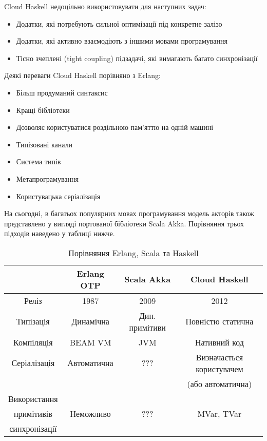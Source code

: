 \documentclass[12pt]{article}
\begin{document}
Cloud Haskell недоцільно використовувати для наступних задач:\\

\begin{itemize}
\item Додатки, які потребують сильної оптимізації під конкретне залізо
\item Додатки, які активно взаємодіють з іншими мовами програмування
\item Тісно зчеплені (tight coupling) підзадачі, які вимагають багато синхронізації
\end{itemize}

Деякі переваги Cloud Haskell порівняно з Erlang:\\
\begin{itemize}
\item Більш продуманий синтаксис
\item Кращі бібліотеки
\item Дозволяє користуватися роздільною пам'яттю на одній машині
\item Типізовані канали
\item Система типів
\item Метапрограмування
\item Користувацька серіалізація
\end{itemize}

На сьогодні, в багатьох популярних мовах програмування модель акторів також представлено у вигляді портованої бібліотеки Scala Akka. Порівняння трьох підходів наведено у таблиці нижче.

\begin {table}
\begin{center}
\begin{tabular}{ c|c|c|c } 
              & Erlang OTP  & Scala Akka           & Cloud Haskell            \\
\hline
Реліз         & 1987        & 2009                 & 2012                     \\ 

Типізація     & Динамічна   & Дин. примітиви       & Повністю статична        \\ 

Компіляція    & BEAM VM     & JVM                  & Нативний код             \\ 

Серіалізація  & Автоматична & ???                  & Визначається користувачем\\ 
              &             &                      & (або автоматична)        \\ 

Використання  &             &                      &                          \\
примітивів    & Неможливо   & ???                  & MVar, TVar               \\ 
синхронізації &             &                      &                          \\

\end{tabular}
\caption {Порівняння Erlang, Scala та Haskell}
\end{center}
\end {table}
\end{document}
